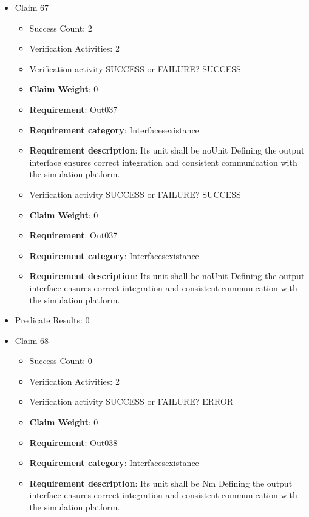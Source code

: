 \documentclass{article}
\begin{document}
\begin{itemize}
  				  \item Claim 67
				\begin{itemize}
			    	\item Success Count: 2 
			    	\item Verification Activities: 2
					\item Verification activity SUCCESS or FAILURE? SUCCESS
					\item \textbf{Claim Weight}: 0
						\item \textbf{Requirement}: Out037 
						\item \textbf{Requirement category}: Interfacesexistance 
						\item \textbf{Requirement description}: Its unit shall be noUnit Defining the output interface ensures correct integration and consistent communication with the simulation platform.
					
					\item Verification activity SUCCESS or FAILURE? SUCCESS
					\item \textbf{Claim Weight}: 0
						\item \textbf{Requirement}: Out037 
						\item \textbf{Requirement category}: Interfacesexistance 
						\item \textbf{Requirement description}: Its unit shall be noUnit Defining the output interface ensures correct integration and consistent communication with the simulation platform.
					
				\end{itemize}
				
									    
				\item Predicate Results: 0

  				  \item Claim 68
				\begin{itemize}
			    	\item Success Count: 0 
			    	\item Verification Activities: 2
					\item Verification activity SUCCESS or FAILURE? ERROR
					\item \textbf{Claim Weight}: 0
						\item \textbf{Requirement}: Out038 
						\item \textbf{Requirement category}: Interfacesexistance 
						\item \textbf{Requirement description}: Its unit shall be Nm Defining the output interface ensures correct integration and consistent communication with the simulation platform.
					

\end{itemize}
\end{itemize}
\end{document}
